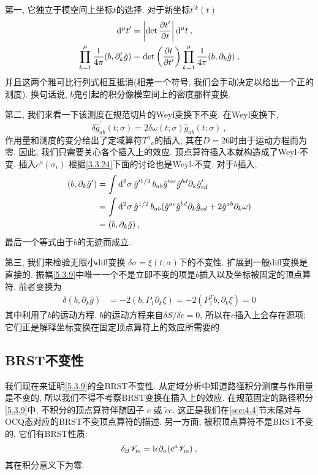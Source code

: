 第一, 它独立于模空间上坐标$t$的选择. 对于新坐标$t^{\prime k}(t)$
	\begin{align}
		\mathrm{d}^{\mu} t^{\prime} &=\left|\operatorname{det} \frac{\partial t^{\prime}}{\partial t}\right| \mathrm{d}^{\mu} t \:, \nonumber  \\
		\prod_{k=1}^{\mu} \frac{1}{4 \pi}(b, \partial_{k}^{\prime} \hat{g}) &=\operatorname{det}\left(\frac{\partial t}{\partial t^{\prime}}\right) \prod_{k=1}^{\mu} \frac{1}{4 \pi}(b, \partial_{k} \hat{g}) \:,  \label{5.4.1}
	\end{align}
并且这两个雅可比行列式相互抵消(相差一个符号, 我们会手动决定以给出一个正的测度). 换句话说, $b$鬼引起的积分像模空间上的密度那样变换.

第二, 我们来看一下该测度在规范切片的Weyl变换下不变. 在Weyl变换下,
\begin{equation}
	\delta \hat{g}_{a b}^{\prime}(t ; \sigma)=2 \delta \omega(t ; \sigma) \hat{g}_{a b}(t ; \sigma) \:, \label{5.4.2}
\end{equation}
作用量和测度的变分给出了定域算符$T^{a}{}_{a}$的插入, 其在$D=26$时由于运动方程而为零. 因此, 我们只需要关心各个插入上的效应. 顶点算符插入本就构造成了Weyl-不变. 
插入$c^{a}(\sigma_{i})$ 根据\eqref{3.3.24}下面的讨论也是Weyl-不变. 对于$b$插入,
	\begin{align}
		(b, \partial_{k} \hat{g}^{\prime}) &=\int \mathrm{d}^{2} \sigma\: \hat{g}^{\prime 1 / 2} \,b_{a b} \hat{g}^{\prime a c} \hat{g}^{b d} \partial_{k} \hat{g}_{c d}^{\prime}  \nonumber \\
		&=\int \mathrm{d}^{2} \sigma \:\hat{g}^{1 / 2} \,b_{a b}(\hat{g}^{a c} \hat{g}^{b d} \partial_{k} \hat{g}_{c d}+2 \hat{g}^{a b} \partial_{k} \omega) \nonumber \\
		&=(b, \partial_{k} \hat{g}) \:, \label{5.4.3}
	\end{align}
最后一个等式由于$b$的无迹而成立.

第三, 我们来检验无限小diff变换 $\delta \sigma=\xi(t ; \sigma) $下的不变性. 扩展到一般diff变换是直接的. 
振幅\eqref{5.3.9}中唯一一个不是立即不变的项是$b$插入以及坐标被固定的顶点算符. 前者变换为
	\begin{align}
		\delta (b, \partial_{k} \hat{g}) &=-2(b, P_{1} \partial_{k} \xi ) =-2(P_{1}^{T} b, \partial_{k} \xi)  =0  \label{5.4.4}
	\end{align}
其中利用了$b$的运动方程. $b$的运动方程来自$\delta S / \delta c=0$, 所以在$c$插入上会存在源项; 它们正是解释坐标变换在固定顶点算符上的效应所需要的.

\subsection*{BRST不变性}
我们现在来证明\eqref{5.3.9}的全BRST不变性. 从定域分析中知道路径积分测度与作用量是不变的, 所以我们不得不考察BRST变换在插入上的效应. 
在规范固定的路径积分\eqref{5.3.9}中, 不积分的顶点算符伴随因子 $c$ 或 $\tilde{c} c$. 这正是我们在\ref{sec:4.4}节末尾对与OCQ态对应的BRST不变顶点算符的描述. 
另一方面, 被积顶点算符不是BRST不变的, 它们有BRST性质: 
\begin{equation}
	\delta_{\mathrm{B}} \mathscr{V}_{\mathrm{m}}=\mathrm{i} \epsilon \partial_{a}(c^{a} \mathscr{V}_{\mathrm{m}}) \:, \label{5.4.5}
\end{equation}
其在积分意义下为零.

